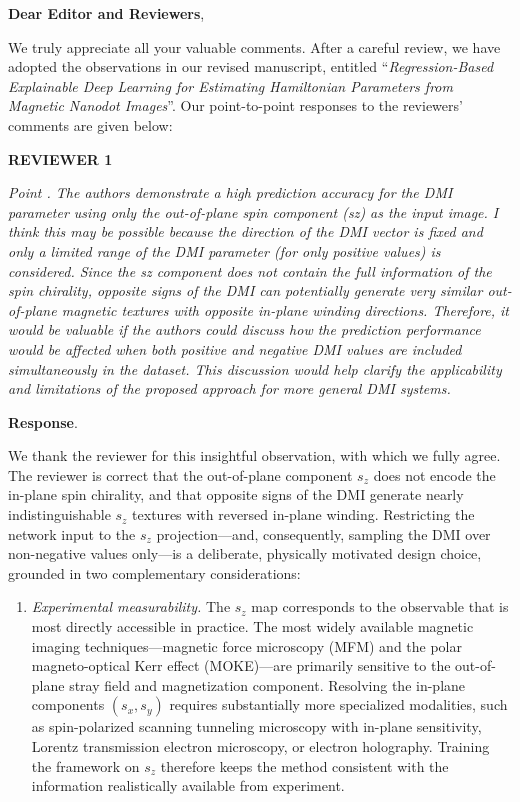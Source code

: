 \documentclass[review,12pt]{report}
\newcommand{\initresponses}{\newcounter{pointcounter}}
\newenvironment{reviewer}{\setcounter{pointcounter}{1}}{}
\newcommand{\point}[1]{\medskip \noindent
 \textsl{{\fontseries{b}\selectfont Point \thepointcounter}.
 \stepcounter{pointcounter} #1}}
\newcommand{\reply}{\medskip \noindent \textbf{Response}.\ }
\begin{document}
\linenumbers

\textbf{Dear Editor and Reviewers},
 
We truly appreciate all your valuable comments. After a careful review, we have adopted the observations in our revised manuscript, entitled ``\textsl{Regression-Based Explainable Deep Learning for Estimating Hamiltonian Parameters from Magnetic Nanodot Images}''. Our point-to-point responses to the reviewers’ comments are given below: 
\initresponses

\begin{reviewer}







\textbf{REVIEWER 1}

 \point{The authors demonstrate a high prediction accuracy for the DMI parameter using only the out-of-plane spin component (sz) as the input image. I think this may be possible because the direction of the DMI vector is fixed and only a limited range of the DMI parameter (for only positive values) is considered. Since the sz component does not contain the full information of the spin chirality, opposite signs of the DMI can potentially generate very similar out-of-plane magnetic textures with opposite in-plane winding directions. Therefore, it would be valuable if the authors could discuss how the prediction performance would be affected when both positive and negative DMI values are included simultaneously in the dataset. This discussion would help clarify the applicability and limitations of the proposed approach for more general DMI systems.}
 
\reply{We thank the reviewer for this insightful observation, with which we fully agree. The reviewer is correct that the out-of-plane component $s_z$ does not encode the in-plane spin chirality, and that opposite signs of the DMI generate nearly indistinguishable $s_z$ textures with reversed in-plane winding. Restricting the network input to the $s_z$ projection---and, consequently, sampling the DMI over non-negative values only---is a deliberate, physically motivated design choice, grounded in two complementary considerations:

\begin{enumerate}
\item \textit{Experimental measurability.} The $s_z$ map corresponds to the observable that is most directly accessible in practice. The most widely available magnetic imaging techniques---magnetic force microscopy (MFM) and the polar magneto-optical Kerr effect (MOKE)---are primarily sensitive to the out-of-plane stray field and magnetization component. Resolving the in-plane components $(s_x,s_y)$ requires substantially more specialized modalities, such as spin-polarized scanning tunneling microscopy with in-plane sensitivity, Lorentz transmission electron microscopy, or electron holography. Training the framework on $s_z$ therefore keeps the method consistent with the information realistically available from experiment.


\end{enumerate}}
\end{reviewer}
\end{document}
